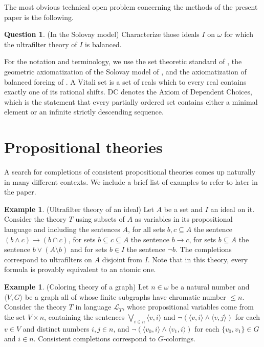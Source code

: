 \documentclass{article}
\newcommand{\gw}{\omega}
\theoremstyle{definition}
\newtheorem{example}[theorem]{Example}
\newtheorem{question}[theorem]{Question}
\begin{document}
\noindent The most obvious technical open problem concerning the methods of the present paper is the following.

\begin{question}
(In the Solovay model) Characterize those ideals $I$ on $\gw$ for which the ultrafilter theory of $I$ is balanced.
\end{question}


	
	
\noindent For the notation and terminology, we use the set theoretic standard of \cite{jech:newset}, the geometric axiomatization of the Solovay model of \cite{z:reloadedA}, and the axiomatization of balanced forcing of \cite{z:reloadedB}. A Vitali set is a set of reals which to every real contains exactly one of its rational shifts. DC denotes the Axiom of Dependent Choices, which is the statement that every partially ordered set contains either a minimal element or an infinite strictly descending sequence.
	
	
	
	
	\section{Propositional theories}
	\label{0section}

A search for completions of consistent propositional theories comes up naturally in many different contexts. We include a brief list of examples to refer to later in the paper.

\begin{example}
\label{ultrafilterexample}
	(Ultrafilter theory of an ideal)
Let $A$ be a set and $I$ an ideal on it. Consider the theory $T$ using subsets of $A$ as variables in its propositional language and including the sentences $A$, for all sets $b, c\subseteq A$ the sentence $(b\land c)\to (b\cap c)$, for sets $b\subseteq c\subseteq A$ the sentence $b\to c$, for sets $b\subseteq A$ the sentence $b\lor (A\setminus b)$ and for sets $b\in I$ the sentence $\lnot b$. The completions correspond to ultrafilters on $A$ disjoint from $I$. Note that in this theory, every formula is provably equivalent to an atomic one.
\end{example}

\begin{example}
\label{coloringexample}
	(Coloring theory of a graph)
	Let $n\in\gw$ be a natural number and $\langle V, G\rangle$ be a graph all of whose finite subgraphs have chromatic number $\leq n$. Consider the theory $T$ in language $\mathcal{L}_T$, whose propositional variables come from the set $V\times n$, containing the sentences $\bigvee_{i\in n}\langle v, i\rangle$  and $\lnot(\langle v, i\rangle\land\langle v, j\rangle)$ for each $v\in V$ and distinct numbers $i, j\in n$, and $\lnot (\langle v_0, i\rangle\land\langle v_1, i\rangle)$ for each $\{v_0, v_1\}\in G$ and $i\in n$. Consistent completions correspond to $G$-colorings.
\end{example}
\end{document}
